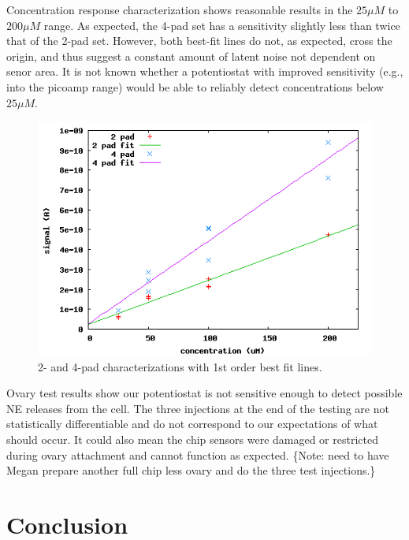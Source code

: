 \documentclass[twocolumn]{article}
\begin{document}
Concentration response characterization shows reasonable results in the $25\mu M$ to $200\mu M$ range. As expected, the 4-pad set has a sensitivity slightly less than twice that of the 2-pad set. However, both best-fit lines do not, as expected, cross the origin, and thus suggest a constant amount of latent noise not dependent on senor area. It is not known whether a potentiostat with improved sensitivity (e.g., into the picoamp range) would be able to reliably detect concentrations below $25\mu M$.

\begin{figure}
\centering
\includegraphics[width=\linewidth]{figures/char.png}
\caption{2- and 4-pad characterizations with 1st order best fit lines.}
\label{char}
\end{figure}

Ovary test results show our potentiostat is not sensitive enough to detect possible NE releases from the cell. The three injections at the end of the testing are not statistically differentiable and do not correspond to our expectations of what should occur. It could also mean the chip sensors were damaged or restricted during ovary attachment and cannot function as expected. \{Note: need to have Megan prepare another full chip less ovary and do the three test injections.\}

\section{Conclusion}

\end{document}
